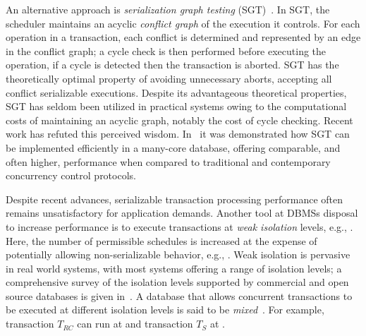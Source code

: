 An alternative approach is 
\emph{serialization graph testing} 
(SGT)~\cite{DBLP:books/aw/BernsteinHG87,DBLP:conf/icde/Durner019}. In SGT, the 
scheduler maintains an acyclic \emph{conflict graph} of the execution it controls. 
For each operation in a transaction, each conflict is determined and represented by an edge in the conflict graph;
a cycle check is then performed before executing the operation, if a cycle is detected then the transaction is aborted. SGT has the theoretically optimal property of avoiding unnecessary aborts, 
accepting all conflict serializable executions. 
Despite its advantageous theoretical properties, SGT has seldom been utilized in practical systems owing to the computational costs of maintaining an acyclic graph, notably 
the cost of cycle checking. Recent work has refuted this perceived wisdom. 
In~\cite{DBLP:conf/icde/Durner019} it was demonstrated how SGT can be 
implemented efficiently in a many-core database, offering comparable, and often 
higher, performance when compared to traditional and contemporary concurrency control 
protocols.

Despite recent advances, serializable transaction processing performance often remains unsatisfactory for application demands. Another tool at DBMSs 
disposal to increase performance is to execute transactions at \emph{weak isolation} levels, 
e.g., . Here, the number of permissible schedules is increased at the
expense of potentially allowing non-serializable behavior, e.g., . 
Weak isolation is pervasive in real world systems, with most systems offering a range of 
isolation levels; a comprehensive survey of the isolation levels supported by commercial 
and open source databases is given in~. A database that allows concurrent 
transactions to be executed at different isolation levels is said to be 
\emph{mixed}~\cite{adya1999weak}. For example, transaction $T_{RC}$ can run at  and transaction $T_{S}$ at
.

